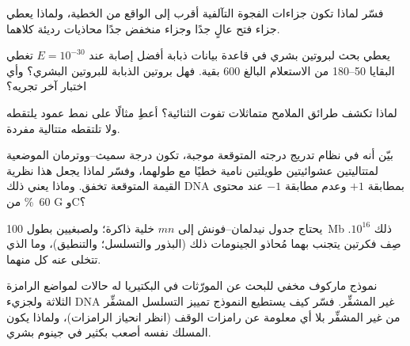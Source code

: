\begin{exercise}[$\star\star$]\label{exo:b3:bioinformatics:7}
فسّر لماذا تكون جزاءات الفجوة التآلفية أقرب إلى الواقع من الخطية،
ولماذا يعطي جزاء فتح عالٍ جدًا وجزاء منخفض جدًا محاذيات
رديئة كلاهما.
\end{exercise}

\begin{exercise}[$\star\star$]\label{exo:b3:bioinformatics:8}
يعطي بحث  لبروتين بشري في قاعدة بيانات ذبابة أفضل
إصابة عند $E = 10^{-30}$ تغطي البقايا 50--180 من الاستعلام البالغ
\num{600} بقية. فهل بروتين الذبابة  للبروتين البشري؟
وأي اختبار آخر تجريه؟
\end{exercise}

\begin{exercise}[$\star\star$]\label{exo:b3:bioinformatics:9}
لماذا تكشف طرائق الملامح متماثلات تفوت  الثنائية؟
أعطِ مثالًا على نمط عمود يلتقطه  ولا تلتقطه
متتالية مفردة.
\end{exercise}

\begin{exercise}[$\star\star\star$]\label{exo:b3:bioinformatics:10}
بيّن أنه في نظام تدريج درجته المتوقعة موجبة، تكون درجة
 سميث--ووترمان الموضعية لمتتاليتين عشوائيتين طويلتين
نامية خطيًا مع طولهما، وفسّر لماذا يجعل هذا نظرية
القيمة المتوقعة تخفق. وماذا يعني ذلك  DNA بمطابقة
$+1$ وعدم مطابقة $-1$ عند محتوى \qty{60}{\%} من G وC؟
\end{exercise}

\begin{exercise}[$\star\star\star$]\label{exo:b3:bioinformatics:11}
يحتاج جدول نيدلمان--فونش إلى $mn$ خلية ذاكرة؛ ولصبغيين بطول
\qty{100}{Mb} ذلك $10^{16}$. صِف فكرتين يتجنب بهما
مُحاذو الجينومات ذلك (البذور والتسلسل؛ والتنطيق)، وما الذي تتخلى عنه
كل منهما.
\end{exercise}

\begin{exercise}[$\star\star\star$]\label{exo:b3:bioinformatics:12}
نموذج ماركوف مخفي للبحث عن المورّثات في البكتيريا له حالات لمواضع
الرامزة الثلاثة ولجزيء DNA غير المشفِّر. فسّر كيف يستطيع النموذج تمييز
التسلسل المشفِّر من غير المشفِّر بلا أي معلومة عن رامزات الوقف
(انظر انحياز الرامزات)، ولماذا يكون المسلك نفسه أصعب بكثير في
جينوم بشري.
\end{exercise}

